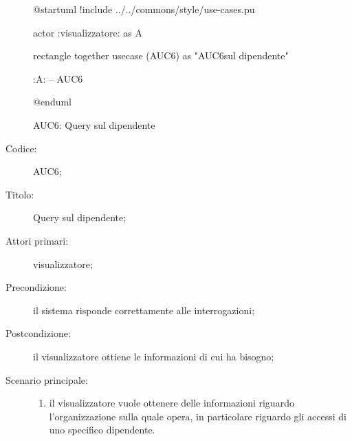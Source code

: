 \documentclass[../../../analisi-dei-requisiti.tex]{subfiles}
\begin{document}
\begin{figure}[H]
  \centering
  \begin{plantuml}
  @startuml
  !include ../../commons/style/use-cases.pu

  actor :visualizzatore: as A

  rectangle {
    together {
      usecase (AUC6) as "AUC6\nQuery sul dipendente"
    }
  }

  :A: -- AUC6

  @enduml
  \end{plantuml}
  \caption{AUC6: Query sul dipendente}%
  \label{fig:AUC6}
\end{figure}

\begin{description}
  \item[Codice:] AUC6;
  \item[Titolo:] Query sul dipendente;
  \item[Attori primari:] visualizzatore;
  \item[Precondizione:] il sistema risponde correttamente alle interrogazioni;
  \item[Postcondizione:] il visualizzatore ottiene le informazioni di cui ha bisogno;
  \item[Scenario principale:]
  \begin{enumerate}
    \item il visualizzatore vuole ottenere delle informazioni riguardo l'organizzazione sulla quale opera, in particolare riguardo gli accessi di uno specifico dipendente.
  \end{enumerate}
\end{description}
\end{document}
